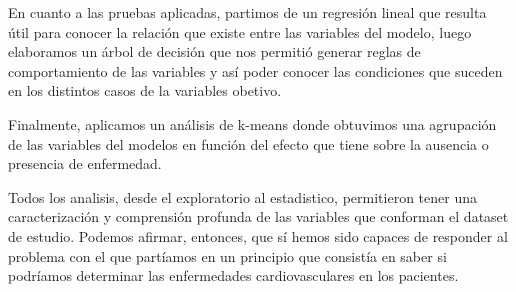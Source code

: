 \documentclass[
]{article}
\begin{document}
En cuanto a las pruebas aplicadas, partimos de un regresión lineal que
resulta útil para conocer la relación que existe entre las variables del
modelo, luego elaboramos un árbol de decisión que nos permitió generar
reglas de comportamiento de las variables y así poder conocer las
condiciones que suceden en los distintos casos de la variables obetivo.

Finalmente, aplicamos un análisis de k-means donde obtuvimos una
agrupación de las variables del modelos en función del efecto que tiene
sobre la ausencia o presencia de enfermedad.

Todos los analisis, desde el exploratorio al estadistico, permitieron
tener una caracterización y comprensión profunda de las variables que
conforman el dataset de estudio. Podemos afirmar, entonces, que sí hemos
sido capaces de responder al problema con el que partíamos en un
principio que consistía en saber si podríamos determinar las
enfermedades cardiovasculares en los pacientes.
\end{document}
